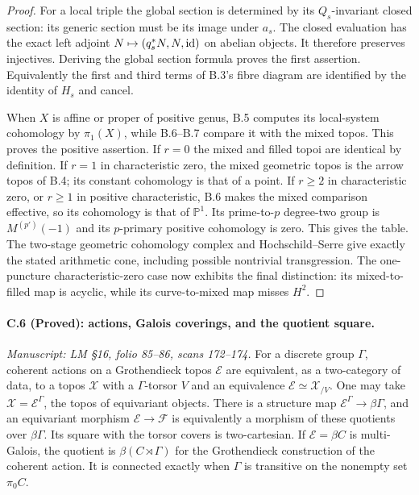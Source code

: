 \begin{proof}
For a local triple the global section is determined
by its $Q_s$-invariant closed section: its generic
section must be its image under $a_s$. The
closed evaluation has the exact left adjoint
$N\mapsto(q_s^*N,N,\mathrm{id})$ on abelian objects.
It therefore preserves injectives. Deriving
the global section formula proves the first
assertion. Equivalently the first and third
terms of B.3's fibre diagram are identified
by the identity of $H_s$ and cancel.

When $X$ is affine or proper of positive genus,
B.5 computes its local-system cohomology by
$\pi_1(X)$, while B.6--B.7 compare it with
the mixed topos. This proves the positive
assertion. If $r=0$ the mixed and filled topoi
are identical by definition. If $r=1$ in
characteristic zero, the mixed geometric
topos is the arrow topos of B.4; its constant
cohomology is that of a point. If $r\geq2$
in characteristic zero, or $r\geq1$ in
positive characteristic, B.6 makes the mixed
comparison effective, so its cohomology is
that of $\mathbb P^1$. Its prime-to-$p$
degree-two group is $M^{(p')}(-1)$ and its
$p$-primary positive cohomology is zero.
This gives the table. The two-stage geometric
cohomology complex and Hochschild--Serre
give exactly the stated arithmetic cone,
including possible nontrivial transgression.
The one-puncture characteristic-zero case
now exhibits the final distinction: its
mixed-to-filled map is acyclic, while its
curve-to-mixed map misses $H^2$.
\end{proof}

\paragraph{C.6 (Proved): actions, Galois coverings, and the quotient square.}\label{C6}
\textit{Manuscript: LM \S16, folio 85--86, scans 172--174.}
For a discrete group $\Gamma$, coherent actions on
a Grothendieck topos $\mathcal E$ are equivalent,
as a two-category of data, to a topos $\mathcal X$
with a $\Gamma$-torsor $V$ and an equivalence
$\mathcal E\simeq\mathcal X_{/V}$.
One may take $\mathcal X=\mathcal E^\Gamma$, the
topos of equivariant objects. There is a
structure map $\mathcal E^\Gamma\to\beta\Gamma$,
and an equivariant morphism $\mathcal E\to\mathcal F$
is equivalently a morphism of these quotients
over $\beta\Gamma$. Its square with the torsor
covers is two-cartesian. If $\mathcal E=\beta C$
is multi-Galois, the quotient is
$\beta(C\rtimes\Gamma)$ for the Grothendieck
construction of the coherent action. It is
connected exactly when $\Gamma$ is transitive
on the nonempty set $\pi_0C$.

